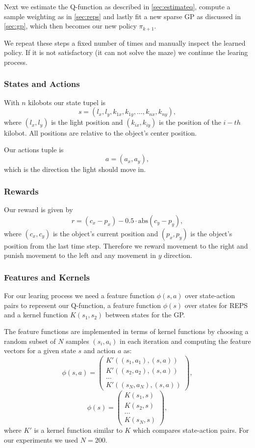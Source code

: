 \documentclass[twoside]{article}
\begin{document}
Next we estimate the Q-function as described in \ref{sec:estimateq},
compute a sample weighting as in \ref{sec:reps} and lastly fit a new sparse
GP as discussed in \ref{sec:gp}, which then becomes our new policy $\pi_{k+1}$.

We repeat these steps a fixed number of times and manually inspect the learned
policy. If it is not satisfactory (it can not solve the maze) we continue the
learing process.

\subsubsection{States and Actions}

With $n$ kilobots our state tupel is
$$s = (l_x, l_y, k_{1x}, k_{1y}, \dots, k_{nx}, k_{ny}), $$
where $(l_x, l_y)$ is the light position and $(k_{ix}, k_{iy})$ is the position
of the $i-th$ kilobot. All positions are relative to the object's center
position.

Our actions tuple is
$$a = (a_x, a_y),$$
which is the direction the light should move in.

\subsubsection{Rewards}

Our reward is given by
$$ r = (c_x - p_x) - 0.5 \cdot \mathrm{abs} (c_y - p_y), $$
where $(c_x, c_y)$ is the object's current position and $(p_x, p_y)$ is the
object's position from the last time step. Therefore we reward movement to the
right and punish movement to the left and any movement in $y$ direction.

\subsubsection{Features and Kernels}

For our learing process we need a feature function $\phi(s, a)$ over
state-action pairs to represent our Q-function, a feature function $\phi(s)$
over states for REPS and a kernel function $K(s_1, s_2)$ between states for the
GP.

The feature functions are implemented in terms of kernel functions by
choosing a random subset of $N$ samples $(s_i, a_i)$ in each iteration and
computing the feature vectors for a given state $s$ and action $a$ as:
$$
\phi(s, a) = \left(
\begin{array}{c}
    K'((s_1, a_1), (s, a)) \\
    K'((s_2, a_2), (s, a)) \\
    \dots \\
    K'((s_N, a_N), (s, a))
\end{array} \right),
$$
$$
\phi(s) = \left(
\begin{array}{c}
    K(s_1, s) \\
    K(s_2, s) \\
    \dots \\
    K(s_N, s)
\end{array} \right),
$$
where $K'$ is a kernel function similar to $K$ which compares state-action
pairs. For our experiments we used $N = 200$.
\end{document}
